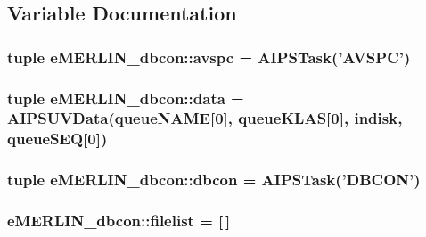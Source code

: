 \subsection{\-Variable \-Documentation}
\hypertarget{namespacee_m_e_r_l_i_n__dbcon_a429c00f0b03f4f27e9854fbed5db3764}{
\subsubsection[{avspc}]{\setlength{\rightskip}{0pt plus 5cm}tuple {\bf e\-M\-E\-R\-L\-I\-N\-\_\-dbcon\-::avspc} = \-A\-I\-P\-S\-Task('\-A\-V\-S\-P\-C')}}\label{namespacee_m_e_r_l_i_n__dbcon_a429c00f0b03f4f27e9854fbed5db3764}
\hypertarget{namespacee_m_e_r_l_i_n__dbcon_a04e130b43c6df2215bebc23fa9dca4b1}{
\subsubsection[{data}]{\setlength{\rightskip}{0pt plus 5cm}tuple {\bf e\-M\-E\-R\-L\-I\-N\-\_\-dbcon\-::data} = \-A\-I\-P\-S\-U\-V\-Data({\bf queue\-N\-A\-M\-E}\mbox{[}0\mbox{]}, {\bf queue\-K\-L\-A\-S}\mbox{[}0\mbox{]}, {\bf indisk}, {\bf queue\-S\-E\-Q}\mbox{[}0\mbox{]})}}\label{namespacee_m_e_r_l_i_n__dbcon_a04e130b43c6df2215bebc23fa9dca4b1}
\hypertarget{namespacee_m_e_r_l_i_n__dbcon_ab17a9c5aaeb6b610ba038d24839ab3b2}{
\subsubsection[{dbcon}]{\setlength{\rightskip}{0pt plus 5cm}tuple {\bf e\-M\-E\-R\-L\-I\-N\-\_\-dbcon\-::dbcon} = \-A\-I\-P\-S\-Task('\-D\-B\-C\-O\-N')}}\label{namespacee_m_e_r_l_i_n__dbcon_ab17a9c5aaeb6b610ba038d24839ab3b2}
\hypertarget{namespacee_m_e_r_l_i_n__dbcon_a8fd1244644d23f545f8a48a7713c73c5}{
\subsubsection[{filelist}]{ {\bf e\-M\-E\-R\-L\-I\-N\-\_\-dbcon\-::filelist} = \mbox{[}$\,$\mbox{]}}}\label{namespacee_m_e_r_l_i_n__dbcon_a8fd1244644d23f545f8a48a7713c73c5}
